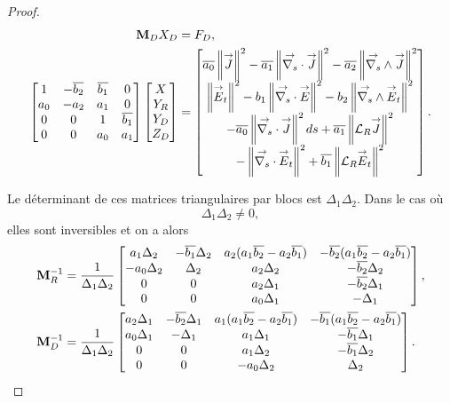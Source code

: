 \begin{proof}
    \begin{align*}
      \mathbf{M}_D  X_D & =  F_D,
      \\
      \begin{bmatrix}
        1 & -{\overline{b_2}} & {\overline{b_1}} & 0
        \\
        a_0 & -a_2 & a_1 & 0
        \\
        0 & 0 & 1 & {\overline{b_1}}
        \\
        0 & 0 & a_0 & a_1
      \end{bmatrix}
      \begin{bmatrix}
        X
        \\
        Y_R
        \\
        Y_D
        \\
        Z_D
      \end{bmatrix}
      & =
      \begin{bmatrix}
        {\overline{a_0}} \left\lVert{\overset{\rightarrow}{J}}\right\rVert^2 - {\overline{a_1}} \left\lVert{\overset{\rightarrow}{\nabla_s}} \cdot {\overset{\rightarrow}{J}}\right\rVert^2 - {\overline{a_2}} \left\lVert{\overset{\rightarrow}{\nabla_s}} \wedge {\overset{\rightarrow}{J}}\right\rVert^2  \\
        \left\lVert{\overset{\rightarrow}{E}}_t\right\rVert^2   - b_1 \left\lVert{\overset{\rightarrow}{\nabla_s}} \cdot {\overset{\rightarrow}{E}} \right\rVert^2  - b_2 \left\lVert{\overset{\rightarrow}{\nabla_s}} \wedge {\overset{\rightarrow}{E}}_t\right\rVert^2  \\
        -{\overline{a_0}} \left\lVert{\overset{\rightarrow}{\nabla_s}} \cdot {\overset{\rightarrow}{J}}\right\rVert^2ds + {\overline{a_1}} \left\lVert{\mathcal{L}_R} {\overset{\rightarrow}{J}}\right\rVert^2  \\
        -\left\lVert{\overset{\rightarrow}{\nabla_s}} \cdot {\overset{\rightarrow}{E}}_t\right\rVert^2   + {\overline{b_1}} \left\lVert{\mathcal{L}_R} {\overset{\rightarrow}{E}}_t\right\rVert^2 
      \end{bmatrix}.
    \end{align*}

    Le déterminant de ces matrices triangulaires par blocs est \(\Delta_1\Delta_2\). Dans le cas où
    \begin{equation*}
      \label{eq:unicite:ci3:csu3-cn-det}
      \Delta_1\Delta_2 \not = 0,
    \end{equation*}
    elles sont inversibles et on a alors
    \begin{align*}
      \mathbf{M}_R^{-1} & =\dfrac{1}{\Delta_1\Delta_2}
      \begin{bmatrix}
        a_1 \Delta_2 & -{\overline{b_1}}\Delta_2 & a_2(a_1{\overline{b_2}}-a_2{\overline{b_1}}) & -{\overline{b_2}}(a_1{\overline{b_2}}-a_2{\overline{b_1}})
        \\
        -a_0 \Delta_2 & \Delta_2 & a_2\Delta_2 & -{\overline{b_2}}\Delta_2
        \\
        0 & 0 & a_2\Delta_1 & -{\overline{b_2}}\Delta_1
        \\
        0 & 0 & a_0\Delta_1 & -\Delta_1
      \end{bmatrix},
      \\
      \mathbf{M}_D^{-1} & =\dfrac{1}{\Delta_1\Delta_2}
      \begin{bmatrix}
        a_2 \Delta_1 & -{\overline{b_2}}\Delta_1 & a_1(a_1{\overline{b_2}}-a_2{\overline{b_1}}) & -{\overline{b_1}}(a_1{\overline{b_2}}-a_2{\overline{b_1}})
        \\
        a_0 \Delta_1 & -\Delta_1 & a_1\Delta_1 & -{\overline{b_1}}\Delta_1
        \\
        0 & 0 & a_1\Delta_2 & -{\overline{b_1}}\Delta_2
        \\
        0 & 0 & -a_0\Delta_2 & \Delta_2
      \end{bmatrix}.
    \end{align*}
    

\end{proof}
